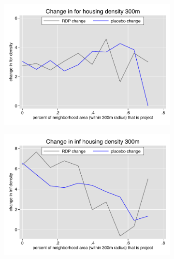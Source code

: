 \documentclass[12pt]{article}
\begin{document}
\begin{figure}
        \begin{subfigure}[b]{0.495\textwidth}
            \centering
            \includegraphics[width=\textwidth,trim={0.3cm .3cm 0.1cm 0cm}, clip=true]{figures/change_for_300_local.pdf}
        \end{subfigure}
        \hfill
        \begin{subfigure}[b]{0.495\textwidth}  
            \centering 
            \includegraphics[width=\textwidth,trim={0.3cm .3cm 0.1cm 0cm}, clip=true]{figures/change_inf_300_local.pdf}
        \end{subfigure}
        \vspace{-6mm}
  \end{figure} 
\end{document}
